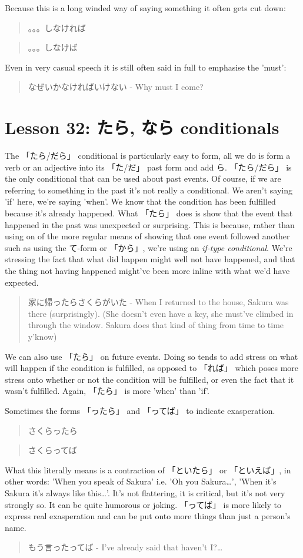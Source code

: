 \documentclass[11pt]{article}
\begin{document}
Because this is a long winded way of saying something it often gets cut down:
\begin{quote}
。。。しなければ
\end{quote}
\begin{quote}
。。。しなけば
\end{quote}
Even in very casual speech it is still often said in full to emphasise the 'must':
\begin{quote}
なぜいかなければいけない - Why must I come?
\end{quote}
\section{Lesson 32: たら, なら conditionals}
\label{sec:org1e5eb26}
The 「たら/だら」 conditional is particularly easy to form, all we do is form a verb or an adjective into its 「た/だ」 past form and add ら. 「たら/だら」 is the only conditional that can be used about past events. Of course, if we are referring to something in the past it's not really a conditional. We aren't saying 'if' here, we're saying 'when'. We know that the condition has been fulfilled because it's already happened. What 「たら」 does is show that the event that happened in the past was unexpected or surprising. This is because, rather than using on of the more regular means of showing that one event followed another such as using the て-form or 「から」, we're using an \emph{if-type conditional}. We're stressing the fact that what did happen might well not have happened, and that the thing not having happened might've been more inline with what we'd have expected.
\begin{quote}
家に帰ったらさくらがいた - When I returned to the house, Sakura was there (surprisingly). (She doesn't even have a key, she must've climbed in through the window. Sakura does that kind of thing from time to time y'know)
\end{quote}

We can also use 「たら」 on future events. Doing so tends to add stress on what will happen if the condition is fulfilled, as opposed to 「れば」 which poses more stress onto whether or not the condition will be fulfilled, or even the fact that it wasn't fulfilled. Again, 「たら」 is more 'when' than 'if'.

Sometimes the forms 「ったら」 and 「ってば」 to indicate exasperation.
\begin{quote}
さくらったら
\end{quote}
\begin{quote}
さくらってば
\end{quote}
What this literally means is a contraction of 「といたら」 or 「といえば」, in other words: 'When you speak of Sakura' i.e. 'Oh you Sakura\ldots{}', 'When it's Sakura it's always like this\ldots{}'. It's not flattering, it is critical, but it's not very strongly so. It can be quite humorous or joking. 「ってば」 is more likely to express real exasperation and can be put onto more things than just a person's name.
\begin{quote}
もう言ったってば - I've already said that haven't I?\ldots{}
\end{quote}
\end{document}
